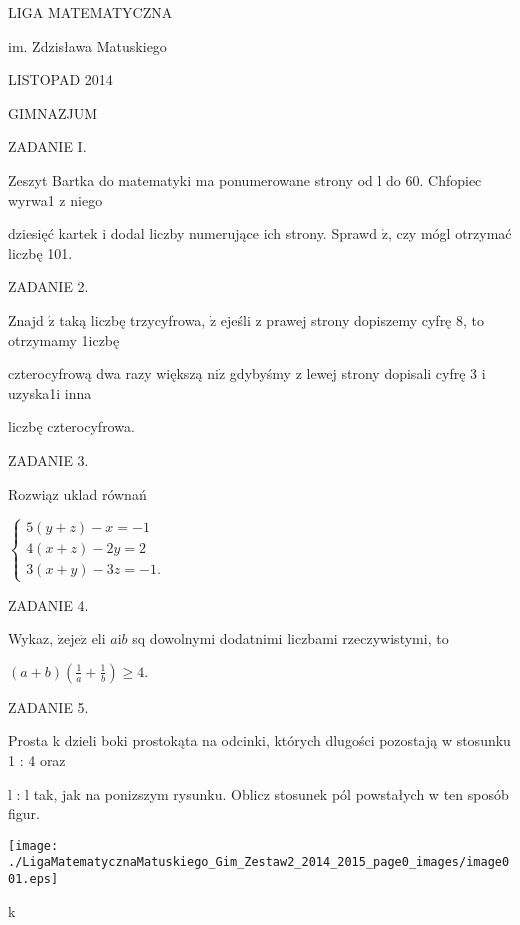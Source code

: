 \documentclass[a4paper,12pt]{article}
\begin{document}
LIGA MATEMATYCZNA

im. Zdzisława Matuskiego

LISTOPAD 2014

GIMNAZJUM

ZADANIE I.

Zeszyt Bartka do matematyki ma ponumerowane strony od l do 60. Chfopiec wyrwa1 z niego

dziesięć kartek i dodal liczby numerujące ich strony. Sprawd $\acute{\mathrm{z}}$, czy mógl otrzymać liczbę 101.

ZADANIE 2.

Znajd $\acute{\mathrm{z}}$ taką liczbę trzycyfrowa, $\dot{\mathrm{z}}$ ejeśli z prawej strony dopiszemy cyfrę 8, to otrzymamy 1iczbę

czterocyfrową dwa razy większą $\mathrm{n}\mathrm{i}\dot{\mathrm{z}}$ gdybyśmy z lewej strony dopisali cyfrę 3 i uzyska1i inna

liczbę czterocyfrowa.

ZADANIE 3.

Rozwiąz uklad równań

$\left\{\begin{array}{l}
5(y+z)-x=-1\\
4(x+z)-2y=2\\
3(x+y)-3z=-1.
\end{array}\right.$

ZADANIE 4.

Wykaz, $\dot{\mathrm{z}}\mathrm{e}\mathrm{j}\mathrm{e}\dot{\mathrm{z}}$ eli $a\mathrm{i}b$ sq dowolnymi dodatnimi liczbami rzeczywistymi, to

$(a+b)(\displaystyle \frac{1}{a}+\frac{1}{b})\geq 4.$

ZADANIE 5.

Prosta k dzieli boki prostokąta na odcinki, których dlugości pozostają w stosunku 1 : 4 oraz

l : l tak, jak na ponizszym rysunku. Oblicz stosunek pól powstałych w ten sposób figur.
\begin{center}
\texttt{[image: ./LigaMatematycznaMatuskiego\_Gim\_Zestaw2\_2014\_2015\_page0\_images/image001.eps]}
\end{center}
k
\end{document}
